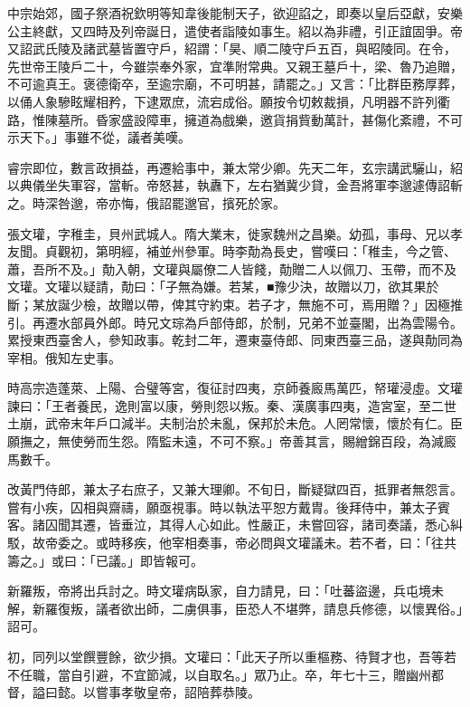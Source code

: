 \begin{pinyinscope}
 中宗始郊，國子祭酒祝欽明等知韋後能制天子，欲迎諂之，即奏以皇后亞獻，安樂公主終獻，又四時及列帝誕日，遣使者詣陵如事生。紹以為非禮，引正誼固爭。帝又詔武氏陵及諸武墓皆置守戶，紹謂：「昊、順二陵守戶五百，與昭陵同。在令，先世帝王陵戶二十，今雖崇奉外家，宜準附常典。又親王墓戶十，梁、魯乃追贈，不可逾真王。褒德衛卒，至逾宗廟，不可明甚，請罷之。」又言：「比群臣務厚葬，以俑人象驂眩耀相矜，下逮眾庶，流宕成俗。願按令切敕裁損，凡明器不許列衢路，惟陳墓所。昏家盛設障車，擁道為戲樂，邀貨捐貲動萬計，甚傷化紊禮，不可示天下。」事雖不從，議者美嘆。



 睿宗即位，數言政損益，再遷給事中，兼太常少卿。先天二年，玄宗講武驪山，紹以典儀坐失軍容，當斬。帝怒甚，執纛下，左右猶冀少貸，金吾將軍李邈遽傳詔斬之。時深咎邈，帝亦悔，俄詔罷邈官，擯死於家。



 張文瓘，字稚圭，貝州武城人。隋大業末，徙家魏州之昌樂。幼孤，事母、兄以孝友聞。貞觀初，第明經，補並州參軍。時李勣為長史，嘗嘆曰：「稚圭，今之管、蕭，吾所不及。」勣入朝，文瓘與屬僚二人皆餞，勣贈二人以佩刀、玉帶，而不及文瓘。文瓘以疑請，勣曰：「子無為嫌。若某，■豫少決，故贈以刀，欲其果於斷；某放誕少檢，故贈以帶，俾其守約束。若子才，無施不可，焉用贈？」因極推引。再遷水部員外郎。時兄文琮為戶部侍郎，於制，兄弟不並臺閣，出為雲陽令。累授東西臺舍人，參知政事。乾封二年，遷東臺侍郎、同東西臺三品，遂與勣同為宰相。俄知左史事。



 時高宗造蓬萊、上陽、合璧等宮，復征討四夷，京師養廄馬萬匹，帑瓘浸虛。文瓘諫曰：「王者養民，逸則富以康，勞則怨以叛。秦、漢廣事四夷，造宮室，至二世土崩，武帝末年戶口減半。夫制治於未亂，保邦於未危。人罔常懷，懷於有仁。臣願撫之，無使勞而生怨。隋監未遠，不可不察。」帝善其言，賜繒錦百段，為減廄馬數千。



 改黃門侍郎，兼太子右庶子，又兼大理卿。不旬日，斷疑獄四百，抵罪者無怨言。嘗有小疾，囚相與齋禱，願亟視事。時以執法平恕方戴胄。後拜侍中，兼太子賓客。諸囚聞其遷，皆垂泣，其得人心如此。性嚴正，未嘗回容，諸司奏議，悉心糾駁，故帝委之。或時移疾，他宰相奏事，帝必問與文瓘議未。若不者，曰：「往共籌之。」或曰：「已議。」即皆報可。



 新羅叛，帝將出兵討之。時文瓘病臥家，自力請見，曰：「吐蕃盜邊，兵屯境未解，新羅復叛，議者欲出師，二虜俱事，臣恐人不堪弊，請息兵修德，以懷異俗。」詔可。



 初，同列以堂饌豐餘，欲少損。文瓘曰：「此天子所以重樞務、待賢才也，吾等若不任職，當自引避，不宜節減，以自取名。」眾乃止。卒，年七十三，贈幽州都督，謚曰懿。以嘗事孝敬皇帝，詔陪葬恭陵。




\end{pinyinscope}
